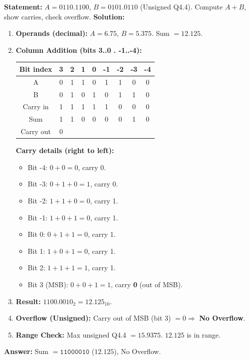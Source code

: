 \documentclass[11pt]{article}
\begin{document}
\begin{exoresolu}
\textbf{Statement:} $A = \mathtt{0110.1100}$, $B = \mathtt{0101.0110}$ (Unsigned Q4.4). Compute $A+B$, show carries, check overflow.
\tcblower
\textbf{Solution:}
\begin{enumerate}
    \item \textbf{Operands (decimal):} $A = 6.75$, $B = 5.375$. Sum $= 12.125$.
    \item \textbf{Column Addition (bits 3..0 . -1..-4):}
        \begin{center}
            \begin{tabular}{c|cccc|cccc}
                Bit index & 3 & 2 & 1 & 0 & -1 & -2 & -3 & -4 \\ \hline
                A         & 0 & 1 & 1 & 0 & 1  & 1  & 0  & 0 \\
                B         & 0 & 1 & 0 & 1 & 0  & 1  & 1  & 0 \\
                Carry in  & 1 & 1 & 1 & 1 & 1  & 0  & 0  & 0 \\
                \hline
                Sum       & 1 & 1 & 0 & 0 & 0  & 0  & 1  & 0 \\
                Carry out & 0 &   &   &   &    &    &    &
            \end{tabular}
        \end{center}
        \textbf{Carry details (right to left):}
        \begin{itemize}
            \item Bit -4: $0+0=0$, carry 0.
            \item Bit -3: $0+1+0=1$, carry 0.
            \item Bit -2: $1+1+0=0$, carry 1.
            \item Bit -1: $1+0+1=0$, carry 1.
            \item Bit 0:  $0+1+1=0$, carry 1.
            \item Bit 1:  $1+0+1=0$, carry 1.
            \item Bit 2:  $1+1+1=1$, carry 1.
            \item Bit 3 (MSB): $0+0+1=1$, carry \textbf{0} (out of MSB).
        \end{itemize}
    \item \textbf{Result:} $\mathtt{1100.0010}_2 = 12.125_{10}$.
    \item \textbf{Overflow (Unsigned):} Carry out of MSB (bit 3) $= 0 \Rightarrow$ \textbf{No Overflow}.
    \item \textbf{Range Check:} Max unsigned Q4.4 $= 15.9375$. $12.125$ is in range.
\end{enumerate}
\textbf{Answer:} Sum $= \mathtt{11000010}$ ($12.125$), No Overflow.
\end{exoresolu}
\end{document}
